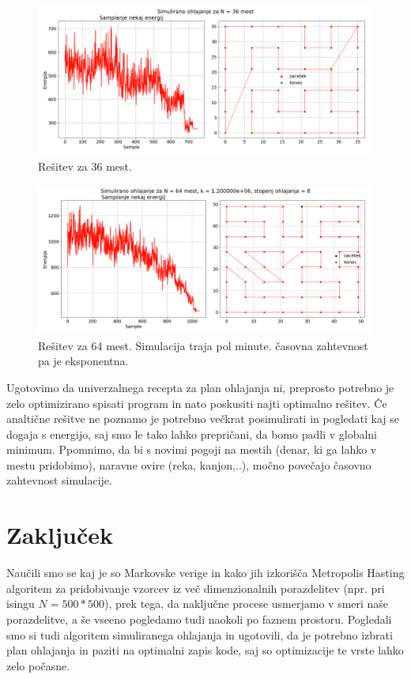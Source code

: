 \documentclass[11pt, a4paper]{article}
\begin{document}
 \begin{figure}[H]
\centering
  \includegraphics[width=17cm, height=5cm]{tretja_N36.png}
\caption{Rešitev za 36 mest.}
\end{figure} 
  \begin{figure}[H]
\centering
  \includegraphics[width=17cm, height=5cm]{tretja_N64.png}
\caption{Rešitev za 64 mest. Simulacija traja pol minute. časovna zahtevnost pa je eksponentna.}


\end{figure} 
Ugotovimo da univerzalnega recepta za plan ohlajanja ni, preprosto potrebno je zelo optimizirano spisati program in nato poskusiti najti optimalno rešitev. Če analtične rešitve ne poznamo je potrebno večkrat posimulirati in pogledati kaj se dogaja s energijo, saj smo le tako lahko prepričani, da bomo padli v globalni minimum.\newline\newline
Ppomnimo, da bi s novimi pogoji na mestih (denar, ki ga lahko v mestu pridobimo),  naravne ovire (reka, kanjon,..), močno povečajo časovno zahtevnost simulacije. 
\section{Zaključek}
Naučili smo se kaj je so Markovske verige in kako jih izkorišča Metropolis Hasting algoritem za pridobivanje vzorcev iz več dimenzionalnih porazdelitev (npr. pri isingu $N = 500*500$), prek tega, da naključne procese usmerjamo v smeri naše porazdelitve, a še vseeno pogledamo tudi naokoli po faznem prostoru. Pogledali smo si tudi algoritem simuliranega ohlajanja in ugotovili, da je potrebno izbrati plan ohlajanja in paziti na optimalni zapis kode, saj so optimizacije te vrste lahko zelo počasne. 
\end{document}
